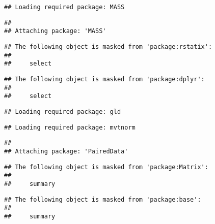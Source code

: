 \documentclass[
]{article}
\newenvironment{Shaded}{\begin{snugshade}}{\end{snugshade}}
\newcommand{\AttributeTok}[1]{\textcolor[rgb]{0.77,0.63,0.00}{#1}}
\newcommand{\ConstantTok}[1]{\textcolor[rgb]{0.00,0.00,0.00}{#1}}
\newcommand{\FunctionTok}[1]{\textcolor[rgb]{0.00,0.00,0.00}{#1}}
\newcommand{\NormalTok}[1]{#1}
\newcommand{\OtherTok}[1]{\textcolor[rgb]{0.56,0.35,0.01}{#1}}
\newcommand{\SpecialCharTok}[1]{\textcolor[rgb]{0.00,0.00,0.00}{#1}}
\newcommand{\StringTok}[1]{\textcolor[rgb]{0.31,0.60,0.02}{#1}}
\begin{document}
\begin{verbatim}
## Loading required package: MASS
\end{verbatim}

\begin{verbatim}
## 
## Attaching package: 'MASS'
\end{verbatim}

\begin{verbatim}
## The following object is masked from 'package:rstatix':
## 
##     select
\end{verbatim}

\begin{verbatim}
## The following object is masked from 'package:dplyr':
## 
##     select
\end{verbatim}

\begin{verbatim}
## Loading required package: gld
\end{verbatim}

\begin{verbatim}
## Loading required package: mvtnorm
\end{verbatim}

\begin{verbatim}
## 
## Attaching package: 'PairedData'
\end{verbatim}

\begin{verbatim}
## The following object is masked from 'package:Matrix':
## 
##     summary
\end{verbatim}

\begin{verbatim}
## The following object is masked from 'package:base':
## 
##     summary
\end{verbatim}

\begin{Shaded}
\end{Shaded}
\end{document}
